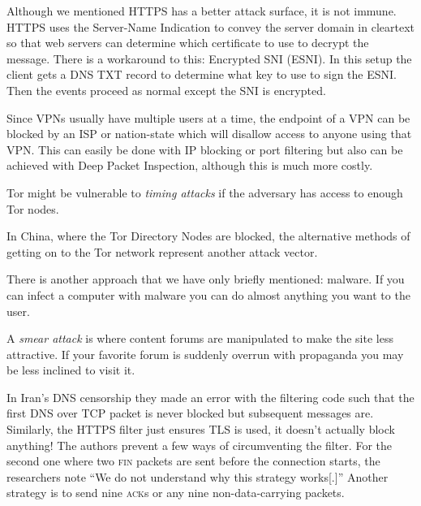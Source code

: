 Although we mentioned HTTPS has a better attack surface, it is not immune. HTTPS
uses the Server-Name Indication to convey the server domain in cleartext so that
web servers can determine which certificate to use to decrypt the message. There
is a workaround to this: Encrypted SNI (ESNI). \cite[p.\@
      8]{wendzelSurveyInternetCensorship2025} In this setup the client gets a DNS TXT
record to determine what key to use to sign the ESNI. Then the events proceed as
normal except the SNI is encrypted.

Since VPNs usually have multiple users at a time, the endpoint of a VPN can be
blocked by an ISP or nation-state which will disallow access to anyone using
that VPN.\cite[p.\@ 8]{wendzelSurveyInternetCensorship2025} This can easily be
done with IP blocking or port filtering but also can be achieved with Deep
Packet Inspection, although this is much more costly.

Tor might be vulnerable to \emph{timing attacks} if the adversary has access to
enough Tor nodes.\cite[p.\@ 9]{wendzelSurveyInternetCensorship2025}

In China, where the Tor Directory Nodes are blocked, the alternative methods of getting on to the Tor network represent another attack vector.

There is another approach that we have only briefly mentioned: malware. If you
can infect a computer with malware you can do almost anything you want to the
user.

A \emph{smear attack} is where content forums are manipulated to make the site
less attractive. If your favorite forum is suddenly overrun with propaganda you
may be less inclined to visit it.

In Iran's DNS censorship they made an error with the filtering code
\cite{bockDetectingEvadingCensorshipDepth} such that the first DNS over TCP
packet is never blocked but subsequent messages are. Similarly, the HTTPS filter
just ensures TLS is used, it doesn't actually block anything! The authors
prevent a few ways of circumventing the filter. For the second one where two
\textsc{fin} packets are sent before the connection starts, the researchers note
``We do not understand why this strategy works[.]'' Another strategy is to send
nine \textsc{ack}s or any nine non-data-carrying packets.
